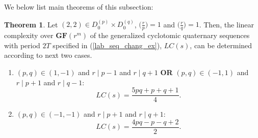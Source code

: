 \documentclass{mcom-l}
\theoremstyle{definition}
\newtheorem{sec3thm1}{Theorem}[section]
\numberwithin{equation}{section}
\begin{document}
     We below list  main theorems of this subsection:
     \begin{sec3thm1}\label{lab_MainThorem_01}
     Let $ (2,2) \in  D_{0}^{(p)}\times D_{0}^{(q)}$, $ \bigl(\tfrac{r}{p}\bigr) =1 $ and $ \bigl(\tfrac{r}{q}\bigr) =1 $. Then, the linear complexity over $ \mathbf{GF}(r^{m}) $ of the generalized cyclotomic quaternary sequences with period $ 2T $ specified in (\ref{lab_seq_chang_ex}), $  LC(s) $, can be determined according to next two cases.
     \begin{enumerate}
     \item $ (p,q)\in (1,-1) $ and $ r\mid p-1 $ and $ r\mid q+1 $ \textbf{OR} $ (p,q)\in (-1,1) $ and $ r\mid p+1 $ and $ r\mid q-1 $:
     \begin{equation*}
     LC(s)=\dfrac{5pq+p+q+1}{4}.
     \end{equation*}
     \item $ (p,q)\in (-1,-1) $ and $ r\mid p+1 $ and $ r\mid q+1 $:
     \begin{equation*}
     LC(s)=\dfrac{4pq-p-q+2}{2}.
     \end{equation*}
     \end{enumerate}
     \end{sec3thm1}
\end{document}
